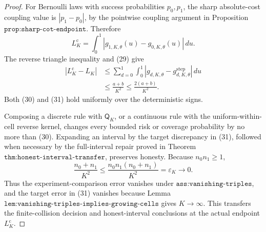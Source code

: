 \documentclass{article}
\begin{document}
\begin{proof}
For Bernoulli laws with success probabilities \(p_0,p_1\), the sharp
absolute-cost coupling value is \(|p_1-p_0|\), by the pointwise
coupling argument in Proposition
\(\texttt{prop:sharp-cot-endpoint}\).  Therefore
\[
 L_K^{\mathrm c}
 =\int_0^1|g_{1,K,\theta}(u)-g_{0,K,\theta}(u)|\,du.
\]
The reverse triangle inequality and (29) give
\[
\begin{aligned}
 |L_K^{\mathrm c}-L_K|
 &\le
 \sum_{d=0}^1\int_0^1
 |g_{d,K,\theta}-g^{\mathrm{step}}_{d,K,\theta}|\,du\\
 &\le\frac{a+b}{K^2}
 \le\frac{2(a+b)}{K^2}.
\end{aligned}
 \tag{31}
\]
Both (30) and (31) hold uniformly over the deterministic signs.

Composing a discrete rule with \(\mathsf Q_K\), or a continuous rule
with the uniform-within-cell reverse kernel, changes every bounded risk
or coverage probability by no more than (30).  Expanding an interval
by the target discrepancy in (31), followed when necessary by the
full-interval repair proved in Theorem
\(\texttt{thm:honest-interval-transfer}\), preserves honesty.  Because
\(n_0n_1\ge1\),
\[
 \frac{n_0+n_1}{K^2}
 \le\frac{n_0n_1(n_0+n_1)}{K^2}
 =\varepsilon_K\longrightarrow0.
 \tag{32}
\]
Thus the experiment-comparison error vanishes under
\(\texttt{ass:vanishing-triples}\), and the target error in (31)
vanishes because Lemma
\(\texttt{lem:vanishing-triples-implies-growing-cells}\) gives
\(K\to\infty\).  This transfers the finite-collision decision and
honest-interval conclusions at the actual endpoint
\(L_K^{\mathrm c}\).


\end{proof}
\end{document}
